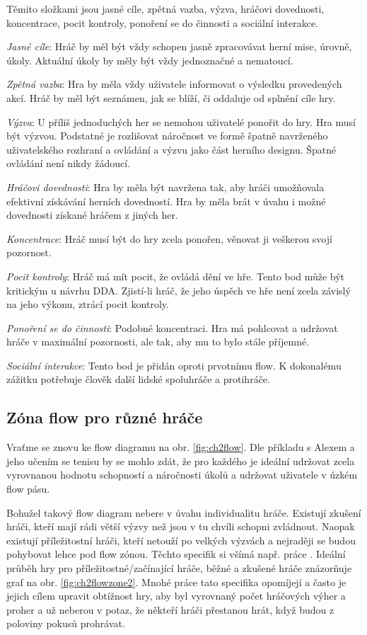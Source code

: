 Těmito složkami jsou jasné cíle, zpětná vazba, výzva, hráčovi dovednosti, koncentrace, pocit kontroly, ponoření se do činnosti a sociální interakce.

\textit{Jasné cíle}: 
Hráč by měl být vždy schopen jasně zpracovávat herní mise, úrovně, úkoly. Aktuální úkoly by měly být vždy jednoznačné a nematoucí.

\textit{Zpětná vazba}: 
Hra by měla vždy uživatele informovat o výsledku provedených akcí. Hráč by měl být seznámen, jak se blíží, či oddaluje od splnění cíle hry.

\textit{Výzva}: 
U příliš jednoduchých her se nemohou uživatelé ponořit do hry. Hra musí být výzvou. Podstatné je rozlišovat náročnost ve formě špatně navrženého uživatelského rozhraní a ovládání a výzvu jako část herního designu. Špatné ovládání není nikdy žádoucí.

\textit{Hráčovi dovednosti}: 
Hra by měla být navržena tak, aby hráči umožňovala efektivní získávání herních dovedností. Hra by měla brát v úvahu i možné dovednosti získané hráčem z jiných her.

\textit{Koncentrace}: 
Hráč musí být do hry zcela ponořen, věnovat ji veškerou svojí pozornost.

\textit{Pocit kontroly}: 
Hráč má mít pocit, že ovládá dění ve hře. Tento bod může být kritickým u návrhu DDA. Zjistí-li hráč, že jeho úspěch ve hře není zcela závislý na jeho výkonu, ztrácí pocit kontroly.

\textit{Ponoření se do činnosti}: 
Podobné koncentraci. Hra má pohlcovat a udržovat hráče v maximální pozornosti, ale tak, aby mu to bylo stále příjemné.

\textit{Sociální interakce}: 
Tento bod je přidán oproti prvotnímu flow. K dokonalému zážitku potřebuje člověk další lidské spoluhráče a protihráče.

\subsection{Zóna flow pro různé hráče}

Vraťme se znovu ke flow diagramu na obr. \ref{fig:ch2flow}. Dle příkladu s Alexem a jeho učením se tenisu by se mohlo zdát, že pro každého je ideální udržovat zcela vyrovnanou hodnotu schopností a náročnosti úkolů a udržovat uživatele v úzkém flow pásu.

Bohužel takový flow diagram nebere v úvahu individualitu hráče. Existují zkušení hráči, kteří mají rádi větší výzvy než jsou v tu chvíli schopni zvládnout. Naopak existují příležitostní hráči, kteří netouží po velkých výzvách a nejraději se budou pohybovat lehce pod flow zónou. Těchto specifik si všímá např. práce \cite{RiskTakers}. Ideální průběh hry pro příležitostné/začínající hráče, běžné a zkušené hráče znázorňuje graf na obr. \ref{fig:ch2flowzone2}. Mnohé práce tato specifika opomíjejí a často je jejich cílem upravit obtížnost hry, aby byl vyrovnaný počet hráčových výher a proher a už neberou v potaz, že někteří hráči přestanou hrát, když budou z poloviny pokusů prohrávat.

